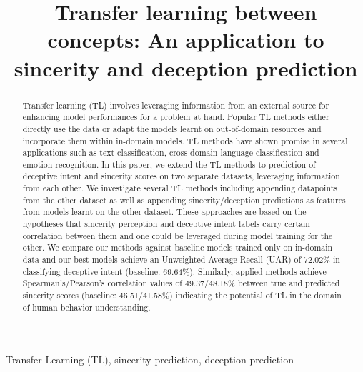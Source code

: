 \documentclass{article}
\title{Transfer learning between concepts: An application to sincerity and deception prediction}
\begin{document}
\ninept
%
\maketitle
%
\begin{abstract}
Transfer learning (TL) involves leveraging information from an external source for enhancing model performances for a problem at hand. 
Popular TL methods either directly use the data or adapt the models learnt on out-of-domain resources and incorporate them within in-domain models. 
TL methods have shown promise in several applications such as text classification, cross-domain language classification and emotion recognition.
In this paper, we extend the TL methods to prediction of deceptive intent and sincerity scores on two separate datasets, leveraging information from each other.
We investigate several TL methods including appending datapoints from the other dataset as well as appending sincerity/deception predictions as features from models learnt on the other dataset. 
These approaches are based on the hypotheses that sincerity perception and deceptive intent labels carry certain correlation between them and one could be leveraged during model training for the other. 
We compare our methods against baseline models trained only on in-domain data and our best models achieve an Unweighted Average Recall (UAR) of 72.02\% in classifying deceptive intent (baseline: 69.64\%). 
Similarly, applied methods achieve Spearman's/Pearson's correlation values of 49.37/48.18\% between true and predicted sincerity scores (baseline: 46.51/41.58\%) indicating the potential of TL in the domain of human behavior understanding.
 
\end{abstract}
%
\begin{keywords}
Transfer Learning (TL), sincerity prediction, deception prediction 
\end{keywords}
%
\end{document}
